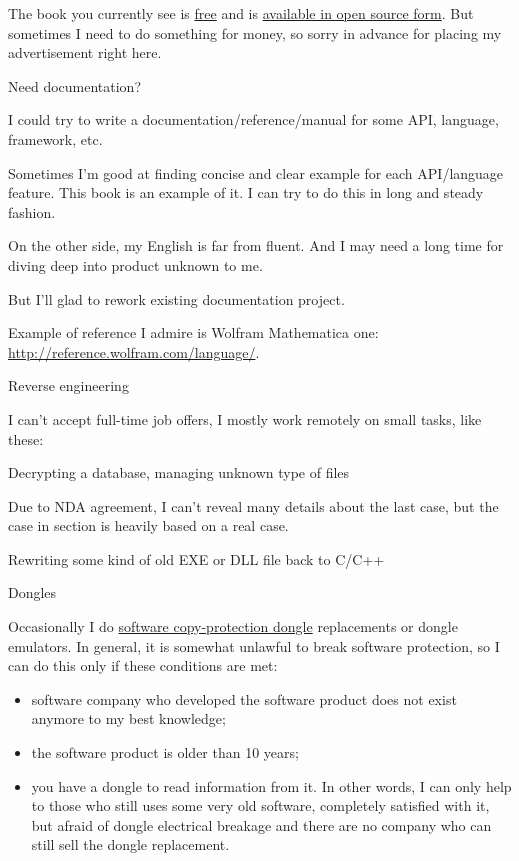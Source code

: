 \vspace*{\fill}

\Huge%
	\ESph{}%
	\PTBRph{}%
	\DEph{}%
	\PLph{}%
	\ITAph{}%
	\FRph{}%
\normalsize

\bigskip
\bigskip
\bigskip

\ifdefined\ENGLISH

The book you currently see is \href{http://beginners.re/}{free} and is \href{https://github.com/dennis714/RE-for-beginners/}{available in open source form}.
But sometimes I need to do something for money, so sorry in advance for placing my advertisement right here.

\Large Need documentation? \normalsize

I could try to write a documentation/reference/manual for some API, language, framework, etc.

Sometimes I'm good at finding concise and clear example for each API/language feature.
This book is an example of it.
I can try to do this in long and steady fashion.

On the other side, my English is far from fluent.
And I may need a long time for diving deep into product unknown to me.

But I'll glad to rework existing documentation project.

Example of reference I admire is Wolfram Mathematica one: \url{http://reference.wolfram.com/language/}.

\Large Reverse engineering \normalsize

I can't accept full-time job offers, I mostly work remotely on small tasks, like these:

\large Decrypting a database, managing unknown type of files \normalsize

Due to NDA agreement, I can't reveal many details about the last case, but the case in  section
is heavily based on a real case.

\large Rewriting some kind of old EXE or DLL file back to C/C++ \normalsize

\large Dongles \normalsize

Occasionally I do \href{https://en.wikipedia.org/wiki/Software_protection_dongle}{software copy-protection dongle} replacements or dongle emulators. In general, it is somewhat unlawful to break software protection, so I can do this only if these conditions are met:

\begin{itemize}
\item software company who developed the software product does not exist anymore to my best knowledge;
\item the software product is older than 10 years;
\item you have a dongle to read information from it. In other words, I can only help to those who still uses some very old software, completely satisfied with it, but afraid of dongle electrical breakage and there are no company who can still sell the dongle replacement. 
\end{itemize}

